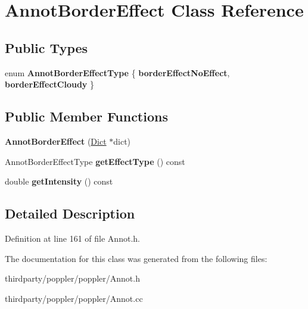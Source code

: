 \hypertarget{class_annot_border_effect}{}\section{Annot\+Border\+Effect Class Reference}
\label{class_annot_border_effect}
\subsection*{Public Types}
\begin{DoxyCompactItemize}
\item 
\mbox{\label{class_annot_border_effect_adf06e786c0184eeee4d45d4d7ee0e929}} 
enum {\bfseries Annot\+Border\+Effect\+Type} \{ {\bfseries border\+Effect\+No\+Effect}, 
{\bfseries border\+Effect\+Cloudy}
 \}
\end{DoxyCompactItemize}
\subsection*{Public Member Functions}
\begin{DoxyCompactItemize}
\item 
\mbox{\label{class_annot_border_effect_a79f6338acf4df951d6ee5e6f4a569552}} 
{\bfseries Annot\+Border\+Effect} (\hyperlink{class_dict}{Dict} $\ast$dict)
\item 
\mbox{\label{class_annot_border_effect_ae52653ce9a234108401c3b67009de336}} 
Annot\+Border\+Effect\+Type {\bfseries get\+Effect\+Type} () const
\item 
\mbox{\label{class_annot_border_effect_aaa6e4c2ab5ac8887ec92b31677b28db3}} 
double {\bfseries get\+Intensity} () const
\end{DoxyCompactItemize}


\subsection{Detailed Description}


Definition at line 161 of file Annot.\+h.



The documentation for this class was generated from the following files\+:\begin{DoxyCompactItemize}
\item 
thirdparty/poppler/poppler/Annot.\+h\item 
thirdparty/poppler/poppler/Annot.\+cc\end{DoxyCompactItemize}
